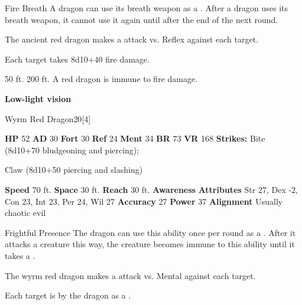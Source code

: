     \begin{freeability}{Fire Breath}
      A dragon can use its breath weapon as a .
      After a dragon uses its breath weapon, it cannot use it again until after the end of the next round.
      \par The ancient red dragon makes a  attack
        vs. Reflex against each target.
    
    \hit Each target takes 8d10+40 fire damage.
    \end{freeability}
  
      
       50 ft.
     200 ft.
     A red dragon is immune to fire damage.
    \par\noindent\textbf{Low-light vision}
  

  \begin{monsubsection}{Wyrm Red Dragon}{20}[4]
    \vspace{-1em}\vspace{-1em}
    \vspace{0em}

    
    

    \begin{spellcontent}
      \begin{spelltargetinginfo}
        \pari \textbf{HP} 52 \monsep
          \textbf{AD} 30 \monsep
          \textbf{Fort} 30 \monsep
          \textbf{Ref} 24 \monsep
          \textbf{Ment} 34
        \pari \textbf{BR} 73 \monsep
        \textbf{VR} 168
        \pari \textbf{Strikes:}
            Bite  (8d10+70 bludgeoning and piercing);
\par Claw  (8d10+50 piercing and slashing)
      \end{spelltargetinginfo}
    \end{spellcontent}
    \begin{monsterfooter}
      \pari \textbf{Speed} 70 ft. \monsep
        \textbf{Space} 30 ft. \monsep
        \textbf{Reach} 30 ft.
      \pari \textbf{Awareness} 
      \pari \textbf{Attributes}
        Str 27, Dex -2,
        Con 23, Int 23,
        Per 24, Wil 27
      \pari \textbf{Accuracy} 27 \monsep
        \textbf{Power} 37
      \pari \textbf{Alignment} Usually chaotic evil
    \end{monsterfooter}
  \end{monsubsection}
  \begin{freeability}{Frightful Presence}
      The dragon can use this ability once per round as a .
      After it attacks a creature this way, the creature becomes immune to this ability until it takes a .
      \par The wyrm red dragon makes a  attack
        vs. Mental against each target.
    
    \hit Each target is  by the dragon as a .
    \end{freeability}
  

